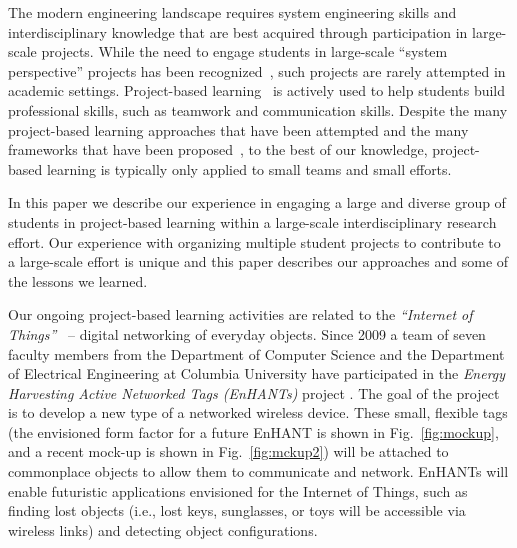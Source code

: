 \documentclass[journal,twopages]{IEEEtran}
\begin{document}
The modern engineering landscape requires system engineering skills and interdisciplinary knowledge that are best acquired through participation in large-scale projects.
While the need to engage students in large-scale ``system perspective'' projects has been recognized~\cite{schocken2012taming,wolf2000embedded}, such projects are rarely attempted in academic settings. Project-based learning~\cite{lee2010project,hussmann2007crazy} is
actively used to help students build professional skills, such as teamwork and communication skills.
Despite the many project-based learning approaches that have been attempted and the many frameworks that have been proposed~\cite{Bernat2000structuring,wenderholm2004challenges,Coleman2012Collaboration,raicu2009enhancing}, to the best of our knowledge, project-based learning is typically only applied to small teams and small efforts.


In this paper we describe our experience in engaging a large and diverse group of students in project-based learning within a large-scale interdisciplinary research effort. Our experience with organizing multiple student projects to contribute to a large-scale effort is unique and this paper describes our approaches and some of the lessons we learned.

Our ongoing project-based learning activities are related to the \emph{``Internet of Things''}~\cite{Gorlatova_Enhants_wircom} -- digital networking of everyday objects.
Since 2009 a team of seven faculty members from the Department of Computer Science and the Department of Electrical Engineering at Co\-lum\-bia University have participated in the \emph{Energy Harvesting Active Networked Tags (EnHANTs)} project \cite{EnHANTsProject}.
The goal of the project is to develop a new type of a networked wireless device.
These small, flexible tags (the envisioned form factor for a future EnHANT is shown in Fig.~\ref{fig:mockup}, and a recent mock-up is shown in Fig.~\ref{fig:mckup2}) will be attached to commonplace objects to allow them to communicate and network.
EnHANTs will enable futuristic applications envisioned for the
Internet of Things, such as finding lost objects (i.e., lost keys, sunglasses, or toys will be accessible via wireless links) and
detecting object configurations. 
\end{document}
